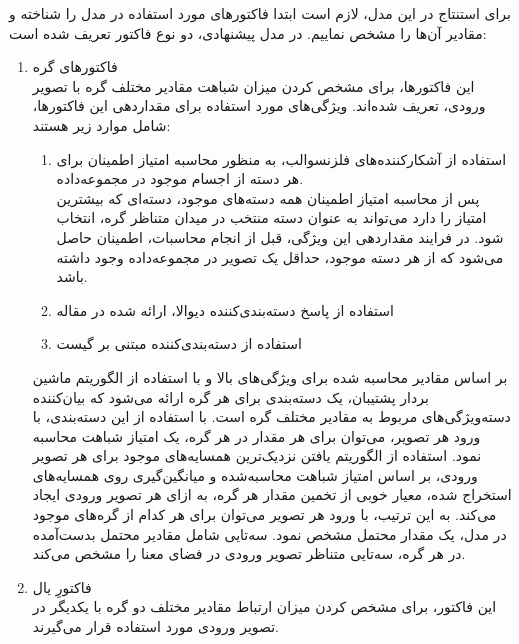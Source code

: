 برای استنتاج در این مدل، لازم است ابتدا فاکتور‌های مورد استفاده در مدل را شناخته و مقادیر آن‌ها را مشخص نماییم. در مدل پیشنهادی، دو نوع فاکتور تعریف شده است:

\begin{enumerate}
\item فاکتورهای گره\\
این فاکتورها، برای مشخص کردن میزان شباهت مقادیر مختلف گره با تصویر ورودی، تعریف شده‌‌اند. ویژگی‌‌های مورد استفاده برای مقداردهی این فاکتورها، شامل موارد زیر هستند:
\begin{enumerate}
	\item	 استفاده از آشکارکننده‌های
	فلزنسوالب، 
	به منظور محاسبه امتیاز اطمینان برای هر دسته از اجسام موجود در مجموعه‌داده\cite{felzenszwalb2008discriminatively}.\\
	پس از محاسبه امتیاز اطمینان همه دسته‌های موجود، دسته‌ای که بیشترین امتیاز را دارد می‌تواند به عنوان دسته‌ منتخب در میدان متناظر گره، انتخاب شود. در فرایند مقداردهی این ویژگی، قبل از انجام محاسبات، اطمینان حاصل می‌شود که از هر دسته موجود، حداقل یک تصویر در مجموعه‌داده وجود داشته باشد.
	\item استفاده از پاسخ دسته‌بندی‌کننده دیوالا، ارائه شده در مقاله\cite{divvala2009empirical}
	\item استفاده از دسته‌بندی‌کننده مبتنی بر گیست\cite{Gist-based classification response}
\end{enumerate}
بر اساس مقادیر محاسبه شده برای ویژگی‌های بالا و با استفاده از الگوریتم ماشین بردار پشتیبان، یک دسته‌بندی برای هر گره ارائه می‌شود که بیان‌کننده دسته‌ویژگی‌های مربوط به مقادیر مختلف گره است. با استفاده از این دسته‌بندی، با ورود هر تصویر، می‌توان برای هر مقدار در هر گره، یک امتیاز شباهت محاسبه نمود. استفاده از الگوریتم یافتن نزدیک‌ترین همسایه‌های موجود برای هر تصویر ورودی، بر اساس امتیاز شباهت محاسبه‌شده و میانگین‌گیری روی همسایه‌های استخراج شده، معیار خوبی از تخمین مقدار هر گره، به ازای هر تصویر ورودی ایجاد می‌کند. به این ترتیب، با ورود هر تصویر می‌توان برای هر کدام از گره‌های موجود در مدل، یک مقدار محتمل مشخص نمود. سه‌تایی شامل مقادیر محتمل بدست‌آمده در هر گره، سه‌تایی متناظر تصویر ورودی در فضای معنا را مشخص می‌کند.
\item فاکتورِ یال\\
این فاکتور، برای مشخص کردن میزان ارتباط مقادیر مختلف دو گره با یکدیگر در تصویر ورودی مورد استفاده قرار می‌گیرند.
\end{enumerate}


